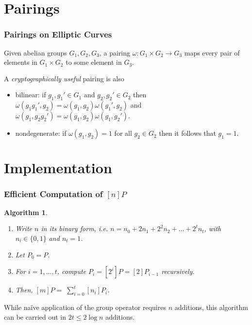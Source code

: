 \documentclass{beamer}
\newtheorem{algorithm}{Algorithm}
\begin{document}
    \section{Pairings}
    \begin{frame}[label=pair]
        \frametitle{Pairings on Elliptic Curves}
        \begin{definition}
            Given abelian groups \(G_1, G_2, G_3\), a pairing
            \(\omega: G_1 \times G_2 \to G_3\) maps every pair of elements
            in \(G_1 \times G_2\) to some element in \(G_3\).
        \end{definition}
        \vfill
        A \emph{cryptographically useful} pairing is also
        \begin{itemize}
            \item bilinear: if \(g_1, g_1' \in G_1\)
            and \(g_2, g_2' \in G_2\)
            then \(\omega(g_1g_1', g_2) =
            \omega(g_1, g_2)\omega(g_1', g_2)\)
            and \(\omega(g_1, g_2g_2') =
            \omega(g_1, g_2)\omega(g_1, g_2')\).
            \item nondegenerate: if \(\omega(g_1, g_2) = 1\)
            for all \(g_2 \in G_2\) then it follows that \(g_1 = 1\).
        \end{itemize}
    \end{frame}

    \section{Implementation}
    \begin{frame}[label=mul]
        \frametitle{Efficient Computation of \([n]P\)}
        \begin{algorithm}
            \begin{enumerate}
                \item Write \(n\) in its binary form, i.e.
                \(n = n_0 + 2n_1 + 2^2n_2 + \dots + 2^tn_t\),
                with \(n_i \in \{0, 1\}\) and \(n_t = 1\).
                \item Let \(P_0 = P\).
                \item For \(i = 1, \dots, t\), compute \(P_i = [2^i]P =
                [2]P_{i - 1}\) recursively.
                \item Then, \([m]P =\sum _{i = 0} ^t [n_i]P_i\).
            \end{enumerate}
        \end{algorithm}
        \vfill
        While na\"{i}ve application of the group operator
        requires \(n\) additions, this algorithm can be carried out
        in \(2t \leq 2 \log n\) additions.
    \end{frame} %
\end{document}
